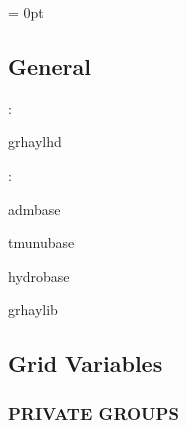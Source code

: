 \documentclass{article}
\begin{document}
\parskip = 0pt

\vspace{3mm} \subsection*{General}

: 

grhaylhd
\vspace{2mm}

: 

admbase

tmunubase

hydrobase

grhaylib
\vspace{2mm}
\subsection*{Grid Variables}
\vspace{5mm}\subsubsection{PRIVATE GROUPS}

\vspace{5mm}
\end{document}
